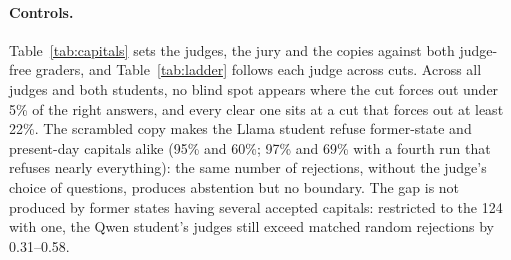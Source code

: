 \paragraph{Controls.} Table~\ref{tab:capitals} sets the judges, the jury and the copies against both judge-free graders, and Table~\ref{tab:ladder} follows each judge across cuts. Across all judges and both students, no blind spot appears where the cut forces out under 5\% of the right answers, and every clear one sits at a cut that forces out at least 22\%. The scrambled copy makes the Llama student refuse former-state and present-day capitals alike (95\% and 60\%; 97\% and 69\% with a fourth run that refuses nearly everything): the same number of rejections, without the judge's choice of questions, produces abstention but no boundary. The gap is not produced by former states having several accepted capitals: restricted to the 124 with one, the Qwen student's judges still exceed matched random rejections by 0.31--0.58.

\begin{table}[t]
\small
\centering
\setlength{\tabcolsep}{4pt}
\caption{The model against its own judge on the unseen probe. \emph{Judge rejects}: share of the known answers that the judge itself would reject at the cut. \emph{Model refuses}: share its trained models refuse. \emph{Accepted, refused}: of the former-state answers the judge accepts, the share the model refuses (number of such answers in brackets). \emph{Rejected, refused}: of the present-day answers the judge rejects, the share the model refuses.}
\label{tab:caric}
\end{table}

